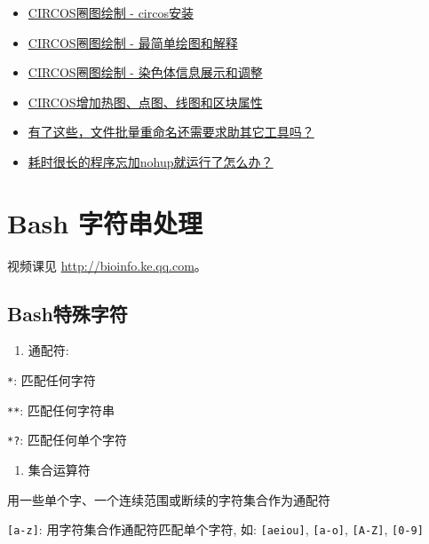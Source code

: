 \documentclass[]{article}
\providecommand{\tightlist}{%
  \setlength{\itemsep}{0pt}\setlength{\parskip}{0pt}}
\numberwithin{figure}{section}
\numberwithin{table}{section}
\begin{document}
\begin{itemize}
\item
  \href{http://mp.weixin.qq.com/s/OEBJU3BiQdQOeN_tD2o7sA}{CIRCOS圈图绘制 - circos安装}
\item
  \href{http://mp.weixin.qq.com/s/2E1Y5-cEdptkQGVm0bxKbQ}{CIRCOS圈图绘制 - 最简单绘图和解释}
\item
  \href{https://mp.weixin.qq.com/s/o_3DyYdSubWCh5FfoVKBOg}{CIRCOS圈图绘制 - 染色体信息展示和调整}
\item
  \href{http://mp.weixin.qq.com/s/6L8wmsy0eOxtiAEs3hYgCA}{CIRCOS增加热图、点图、线图和区块属性}
\item
  \href{https://mp.weixin.qq.com/s/hyiGxm0jx6xEc90nHLN4dQ}{有了这些，文件批量重命名还需要求助其它工具吗？}
\item
  \href{https://mp.weixin.qq.com/s/kt_e-DCq7xBfh9tTCJinZQ}{耗时很长的程序忘加nohup就运行了怎么办？}
\end{itemize}

\hypertarget{bash_string}{%
\section{Bash 字符串处理}\label{bash_string}}

视频课见 \url{http://bioinfo.ke.qq.com}。

\hypertarget{bash_specific}{%
\subsection{Bash特殊字符}\label{bash_specific}}

\begin{enumerate}
\def\labelenumi{\arabic{enumi}.}
\tightlist
\item
  通配符:
\end{enumerate}

\texttt{*}: 匹配任何字符

\texttt{**}: 匹配任何字符串

\texttt{*?}: 匹配任何单个字符

\begin{enumerate}
\def\labelenumi{\arabic{enumi}.}
\setcounter{enumi}{1}
\tightlist
\item
  集合运算符
\end{enumerate}

用一些单个字、一个连续范围或断续的字符集合作为通配符

\texttt{{[}a-z{]}}: 用字符集合作通配符匹配单个字符, 如: \texttt{{[}aeiou{]}}, \texttt{{[}a-o{]}}, \texttt{{[}A-Z{]}}, \texttt{{[}0-9{]}}
\end{document}
